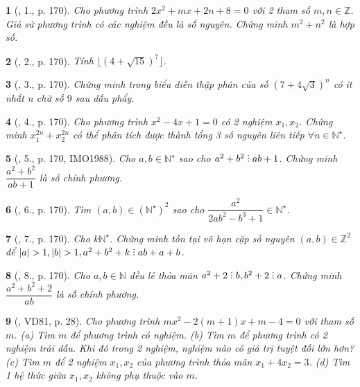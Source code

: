 \documentclass{article}
\newtheorem{baitoan}{}
\DeclareRobustCommand{\divby}{%
	\mathrel{\vbox{\baselineskip.65ex\lineskiplimit0pt\hbox{.}\hbox{.}\hbox{.}}}%
}
\begin{document}
\begin{baitoan}[\cite{Thu_Viet_Minh_ptb2}, 1., p. 170]
	Cho phương trình $2x^2 + mx + 2n + 8 = 0$ với 2 tham số $m,n\in\mathbb{Z}$. Giả sử phương trình có các nghiệm đều là số nguyên. Chứng minh $m^2 + n^2$ là hợp số.
\end{baitoan}

\begin{baitoan}[\cite{Thu_Viet_Minh_ptb2}, 2., p. 170]
	Tính $\lfloor(4 + \sqrt{15})^7\rfloor$.
\end{baitoan}

\begin{baitoan}[\cite{Thu_Viet_Minh_ptb2}, 3., p. 170]
	Chứng minh trong biểu diễn thập phân của số $(7 + 4\sqrt{3})^n$ có ít nhất n chữ số $9$ sau dấu phẩy.
\end{baitoan}

\begin{baitoan}[\cite{Thu_Viet_Minh_ptb2}, 4., p. 170]
	Cho phương trình $x^2 - 4x + 1 = 0$ có 2 nghiệm $x_1,x_2$. Chứng minh $x_1^{2n} + x_2^{2n}$ có thể phân tích được thành tổng 3 số nguyên liên tiếp $\forall n\in\mathbb{N}^\star$.
\end{baitoan}

\begin{baitoan}[\cite{Thu_Viet_Minh_ptb2}, 5., p. 170, IMO1988]
	Cho $a,b\in\mathbb{N}^\star$ sao cho $a^2 + b^2\divby ab + 1$. Chứng minh $\dfrac{a^2 + b^2}{ab + 1}$ là số chính phương.
\end{baitoan}

\begin{baitoan}[\cite{Thu_Viet_Minh_ptb2}, 6., p. 170]
	Tìm $(a,b)\in(\mathbb{N}^\star)^2$ sao cho $\dfrac{a^2}{2ab^2 - b^3 + 1}\in\mathbb{N}^\star$.
\end{baitoan}

\begin{baitoan}[\cite{Thu_Viet_Minh_ptb2}, 7., p. 170]
	Cho $k\mathbb{N}^\star$. Chứng minh tồn tại vô hạn cặp số nguyên $(a,b)\in\mathbb{Z}^2$ để $|a| > 1,|b| > 1,a^2 + b^2 + k\divby ab + a + b$.
\end{baitoan}

\begin{baitoan}[\cite{Thu_Viet_Minh_ptb2}, 8., p. 170]
	Cho $a,b\in\mathbb{N}$ đều lẻ thỏa mãn $a^2 + 2\divby b,b^2 + 2\divby a$. Chứng minh $\dfrac{a^2 + b^2 + 2}{ab}$ là số chính phương.
\end{baitoan}

\begin{baitoan}[\cite{Binh_Toan_9_tap_2}, VD81, p. 28]
	Cho phương trình $mx^2 - 2(m + 1)x + m - 4 = 0$ với tham số $m$. (a) Tìm $m$ để phương trình có nghiệm. (b) Tìm $m$ để phương trình có 2 nghiệm trái dấu. Khi đó trong 2 nghiệm, nghiệm nào có giá trị tuyệt đối lớn hơn? (c) Tìm $m$ để 2 nghiệm $x_1,x_2$ của phương trình thỏa mãn $x_1 + 4x_2 = 3$. (d) Tìm 1 hệ thức giữa $x_1,x_2$ không phụ thuộc vào $m$.
\end{baitoan}
\end{document}
